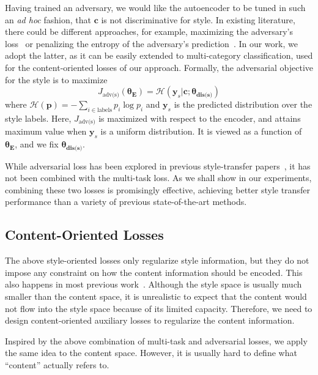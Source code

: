 \documentclass[letterpaper]{article} %
\newcommand{\loss}[1]{J_{\text{#1}}}
\newcommand{\nnweight}[1]{\bm{\theta_{\text{#1}}}}
\begin{document}
Having trained an adversary, we would like the autoencoder to be tuned in such an \textit{ad hoc} fashion, that $\bm c$ is not discriminative for style.
In existing literature, there could be different approaches, for example, maximizing the adversary's loss~\cite{shen2017style,zhao2018adversarially} or penalizing the entropy of the adversary's prediction~\cite{fu2018style}.
In our work, we adopt the latter, as it can be easily extended to multi-category classification, used for the content-oriented losses of our approach. Formally, the adversarial objective for the style is to maximize
\begin{equation} \label{eqn:advs}
	\loss{adv(s)}(\nnweight{E})=\mathcal{H}(\bm y_s|\bm c; \nnweight{dis(s)})
\end{equation}
where $\mathcal{H}(\bm p)=-\sum_{i\in\text{labels}}p_i\log p_i$ and $\bm y_s$ is the predicted distribution over the style labels. Here, $\loss{adv(s)}$ is maximized with respect to the encoder, and attains maximum value when $\bm y_s$ is a uniform distribution. It is viewed as a function of $\nnweight{E}$, and we fix $\nnweight{dis(s)}$.

While adversarial loss has been explored in previous style-transfer papers~\cite{shen2017style,fu2018style}, it has not been combined with the multi-task loss. As we shall show in our experiments, combining these two losses is promisingly effective, achieving better style transfer performance than a variety of previous state-of-the-art methods.

\subsection{Content-Oriented Losses}

The above style-oriented losses only regularize style information, but they do not impose any constraint on how the content information should be encoded. This also happens in most previous work~\cite{hu2017toward,shen2017style,fu2018style}.
Although the style space is usually much smaller than the content space, it is unrealistic to expect that the content would not flow into the style space because of its limited capacity. Therefore, we need to design content-oriented auxiliary losses to regularize the content information.

Inspired by the above combination of multi-task and adversarial losses, we apply the same idea to the content space. However, it is usually hard to define what ``content'' actually refers to.
\end{document}
